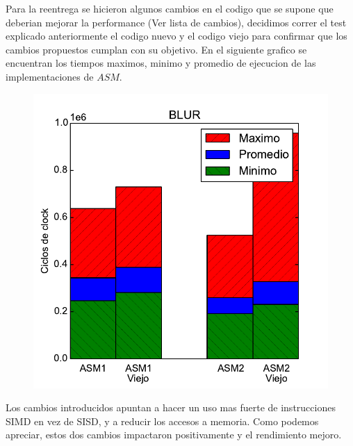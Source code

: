Para la reentrega se hicieron algunos cambios en el codigo que se supone que deberian mejorar la performance (Ver lista de cambios), decidimos correr el test explicado anteriormente el codigo nuevo y el codigo viejo para confirmar que los cambios propuestos cumplan con su objetivo. En el siguiente grafico se encuentran los tiempos maximos, minimo y promedio de ejecucion de las implementaciones de $ASM$.

\begin{figure}[h!]
	\centering
	\includegraphics[scale=0.45]{images/blur_comparationOLD}
\end{figure}

\newpage

Los cambios introducidos apuntan a hacer un uso mas fuerte de instrucciones SIMD en vez de SISD, y a reducir los accesos a memoria. Como podemos apreciar, estos dos cambios impactaron positivamente y el rendimiento mejoro.


